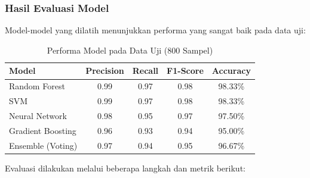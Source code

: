 \subsubsection{Hasil Evaluasi Model}
Model-model yang dilatih menunjukkan performa yang sangat baik pada data uji:

\begin{table}[htbp]
\centering
\caption{Performa Model pada Data Uji (800 Sampel)}
\label{tabel:performaModelUji}
\begin{tabular}{|l|c|c|c|c|}
\hline 
\textbf{Model} & \textbf{Precision} & \textbf{Recall} & \textbf{F1-Score} & \textbf{Accuracy} \\
\hline
Random Forest & 0.99 & 0.97 & 0.98 & 98.33\% \\
\hline
SVM & 0.99 & 0.97 & 0.98 & 98.33\% \\
\hline
Neural Network & 0.98 & 0.95 & 0.97 & 97.50\% \\
\hline
Gradient Boosting & 0.96 & 0.93 & 0.94 & 95.00\% \\
\hline
Ensemble (Voting) & 0.97 & 0.94 & 0.95 & 96.67\% \\
\hline
\end{tabular}
\end{table}

Evaluasi dilakukan melalui beberapa langkah dan metrik berikut:

